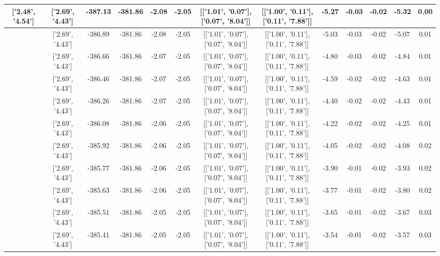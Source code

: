 \begin{table}[htbp]
\begin{adjustbox}{angle=90}
\begin{tabular}{|c|c|c|c|c|c|c|c|c|c|c|c|c|}
 ['2.48', '4.54'] & ['2.69', '4.43'] & -387.13 & -381.86 & -2.08 & -2.05 & [['1.01', '0.07'], ['0.07', '8.04']] & [['1.00', '0.11'], ['0.11', '7.88']] & -5.27 & -0.03 & -0.02 & -5.32 & 0.00\\ \hline
 ['2.49', '4.53'] & ['2.69', '4.43'] & -386.89 & -381.86 & -2.08 & -2.05 & [['1.01', '0.07'], ['0.07', '8.04']] & [['1.00', '0.11'], ['0.11', '7.88']] & -5.03 & -0.03 & -0.02 & -5.07 & 0.01\\ \hline
 ['2.50', '4.53'] & ['2.69', '4.43'] & -386.66 & -381.86 & -2.07 & -2.05 & [['1.01', '0.07'], ['0.07', '8.04']] & [['1.00', '0.11'], ['0.11', '7.88']] & -4.80 & -0.03 & -0.02 & -4.84 & 0.01\\ \hline
 ['2.52', '4.52'] & ['2.69', '4.43'] & -386.46 & -381.86 & -2.07 & -2.05 & [['1.01', '0.07'], ['0.07', '8.04']] & [['1.00', '0.11'], ['0.11', '7.88']] & -4.59 & -0.02 & -0.02 & -4.63 & 0.01\\ \hline
 ['2.53', '4.51'] & ['2.69', '4.43'] & -386.26 & -381.86 & -2.07 & -2.05 & [['1.01', '0.07'], ['0.07', '8.04']] & [['1.00', '0.11'], ['0.11', '7.88']] & -4.40 & -0.02 & -0.02 & -4.43 & 0.01\\ \hline
 ['2.54', '4.51'] & ['2.69', '4.43'] & -386.08 & -381.86 & -2.06 & -2.05 & [['1.01', '0.07'], ['0.07', '8.04']] & [['1.00', '0.11'], ['0.11', '7.88']] & -4.22 & -0.02 & -0.02 & -4.25 & 0.01\\ \hline
 ['2.56', '4.50'] & ['2.69', '4.43'] & -385.92 & -381.86 & -2.06 & -2.05 & [['1.01', '0.07'], ['0.07', '8.04']] & [['1.00', '0.11'], ['0.11', '7.88']] & -4.05 & -0.02 & -0.02 & -4.08 & 0.02\\ \hline
 ['2.57', '4.49'] & ['2.69', '4.43'] & -385.77 & -381.86 & -2.06 & -2.05 & [['1.01', '0.07'], ['0.07', '8.04']] & [['1.00', '0.11'], ['0.11', '7.88']] & -3.90 & -0.01 & -0.02 & -3.93 & 0.02\\ \hline
 ['2.58', '4.49'] & ['2.69', '4.43'] & -385.63 & -381.86 & -2.06 & -2.05 & [['1.01', '0.07'], ['0.07', '8.04']] & [['1.00', '0.11'], ['0.11', '7.88']] & -3.77 & -0.01 & -0.02 & -3.80 & 0.02\\ \hline
 ['2.59', '4.48'] & ['2.69', '4.43'] & -385.51 & -381.86 & -2.05 & -2.05 & [['1.01', '0.07'], ['0.07', '8.04']] & [['1.00', '0.11'], ['0.11', '7.88']] & -3.65 & -0.01 & -0.02 & -3.67 & 0.03\\ \hline
 ['2.61', '4.48'] & ['2.69', '4.43'] & -385.41 & -381.86 & -2.05 & -2.05 & [['1.01', '0.07'], ['0.07', '8.04']] & [['1.00', '0.11'], ['0.11', '7.88']] & -3.54 & -0.01 & -0.02 & -3.57 & 0.03\\ \hline

\end{tabular}
\end{adjustbox}
\end{table}
